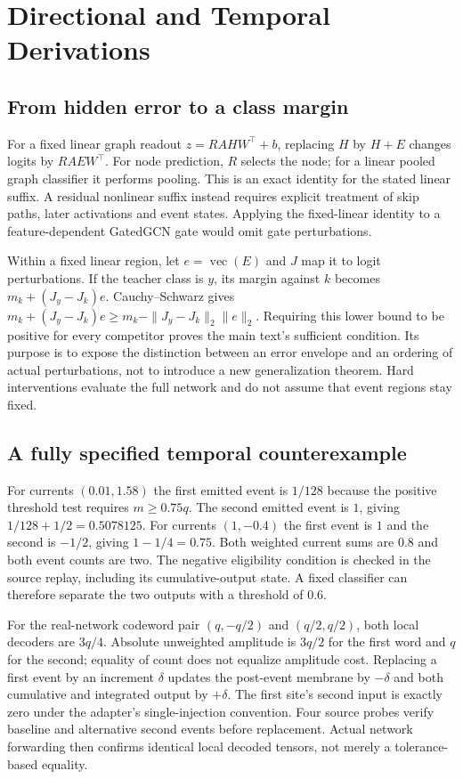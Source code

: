 \documentclass[10pt,twocolumn,letterpaper]{article}
\begin{document}
\section{Directional and Temporal Derivations}
\subsection{From hidden error to a class margin}
For a fixed linear graph readout $z=RAHW^\top+b$, replacing $H$ by $H+E$ changes logits by $RAEW^\top$. For node prediction, $R$ selects the node; for a linear pooled graph classifier it performs pooling. This is an exact identity for the stated linear suffix. A residual nonlinear suffix instead requires explicit treatment of skip paths, later activations and event states. Applying the fixed-linear identity to a feature-dependent GatedGCN gate would omit gate perturbations.

Within a fixed linear region, let $e=\operatorname{vec}(E)$ and $J$ map it to logit perturbations. If the teacher class is $y$, its margin against $k$ becomes $m_k+(J_y-J_k)e$. Cauchy--Schwarz gives $m_k+(J_y-J_k)e\geq m_k-\|J_y-J_k\|_2\|e\|_2$. Requiring this lower bound to be positive for every competitor proves the main text's sufficient condition. Its purpose is to expose the distinction between an error envelope and an ordering of actual perturbations, not to introduce a new generalization theorem. Hard interventions evaluate the full network and do not assume that event regions stay fixed.

\subsection{A fully specified temporal counterexample}
For currents $(0.01,1.58)$ the first emitted event is $1/128$ because the positive threshold test requires $m\geq0.75q$. The second emitted event is $1$, giving $1/128+1/2=0.5078125$. For currents $(1,-0.4)$ the first event is $1$ and the second is $-1/2$, giving $1-1/4=0.75$. Both weighted current sums are $0.8$ and both event counts are two. The negative eligibility condition is checked in the source replay, including its cumulative-output state. A fixed classifier can therefore separate the two outputs with a threshold of $0.6$.

For the real-network codeword pair $(q,-q/2)$ and $(q/2,q/2)$, both local decoders are $3q/4$. Absolute unweighted amplitude is $3q/2$ for the first word and $q$ for the second; equality of count does not equalize amplitude cost. Replacing a first event by an increment $\delta$ updates the post-event membrane by $-\delta$ and both cumulative and integrated output by $+\delta$. The first site's second input is exactly zero under the adapter's single-injection convention. Four source probes verify baseline and alternative second events before replacement. Actual network forwarding then confirms identical local decoded tensors, not merely a tolerance-based equality.
\end{document}
